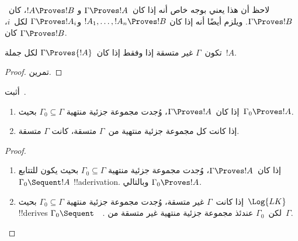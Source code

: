 \documentclass[../../../include/open-logic-section]{subfiles}
\begin{document}
لاحظ أن هذا يعني بوجه خاص أنه إذا كان~$\Gamma \Proves !A$ و
$!A \Proves !B$، كان~$\Gamma \Proves !B$. ويلزم أيضًا أنه إذا كان
$!A_1, \dots, !A_n \Proves !B$ و$\Gamma \Proves !A_i$ لكل~$i$، كان
$\Gamma \Proves !B$.

\begin{prop}
تكون~$\Gamma$ غير متسقة إذا وفقط إذا كان~$\Gamma \Proves {!A}$ لكل
جملة~$!A$.
\end{prop}

\begin{proof}
تمرين.
\end{proof}

\begin{prob}
أثبت~.
\end{prob}

\begin{prop}[التراص]
  \begin{enumerate}
  \item إذا كان~$\Gamma \Proves !A$، وُجدت مجموعة جزئية منتهية
    $\Gamma_0 \subseteq \Gamma$ بحيث~$\Gamma_0 \Proves !A$.
  \item إذا كانت كل مجموعة جزئية منتهية من~$\Gamma$ متسقة، كانت
    $\Gamma$ متسقة.
  \end{enumerate}
\end{prop}

\begin{proof}
  \begin{enumerate}
    \item إذا كان~$\Gamma \Proves !A$، وُجدت مجموعة جزئية منتهية
      $\Gamma_0 \subseteq \Gamma$ بحيث يكون للتتابع
      $\Gamma_0 \Sequent !A$ !!a{derivation}. وبالتالي
      $\Gamma_0 \Proves !A$.
    \item إذا كانت~$\Gamma$ غير متسقة، وُجدت مجموعة جزئية منتهية
      $\Gamma_0 \subseteq \Gamma$ بحيث~$\Log{LK}$ !!{derive}s
      $\Gamma_0 \Sequent \quad$. لكن~$\Gamma_0$ عندئذ مجموعة جزئية
      منتهية غير متسقة من~$\Gamma$.
  \end{enumerate}
\end{proof}
\end{document}
